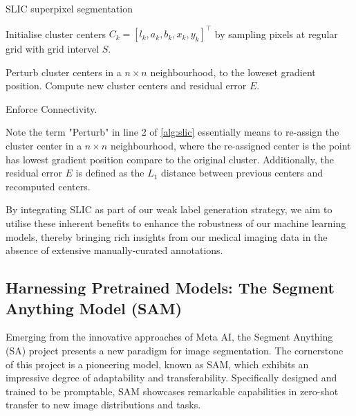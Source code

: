 \begin{algorithm}[ht]
\caption{SLIC superpixel segmentation}\label{alg:slic}
\begin{algorithmic}[1]
\item Initialise cluster centers \(C_{k} = \left[l_{k}, a_{k}, b_{k}, x_{k}, y_{k}\right]^{\top}\) by sampling pixels at regular grid with grid intervel \(S\).
\item Perturb cluster centers in a \(n \times n\) neighbourhood, to the loweset gradient position.
    \EndFor
    \State Compute new cluster centers and residual error \(E\).
\EndWhile
\item Enforce Connectivity.
\end{algorithmic}
\end{algorithm}

Note the term "Perturb" in line 2 of \autoref{alg:slic} essentially means to re-assign the cluster center in a \(n \times  n\) neighbourhood, where the re-assigned center is the point has lowest gradient position compare to the original cluster. Additionally, the residual error \(E\) is defined as the \(L_{1}\) distance between previous centers and recomputed centers.

By integrating SLIC as part of our weak label generation strategy, we aim to utilise these inherent benefits to enhance the robustness of our machine learning models, thereby bringing rich insights from our medical imaging data in the absence of extensive manually-curated annotations.

\subsection{Harnessing Pretrained Models: The Segment Anything Model (SAM)}
Emerging from the innovative approaches of Meta AI, the Segment Anything (SA) project presents a new paradigm for image segmentation. The cornerstone of this project is a pioneering model, known as SAM, which exhibits an impressive degree of adaptability and transferability. Specifically designed and trained to be promptable, SAM showcases remarkable capabilities in zero-shot transfer to new image distributions and tasks.

